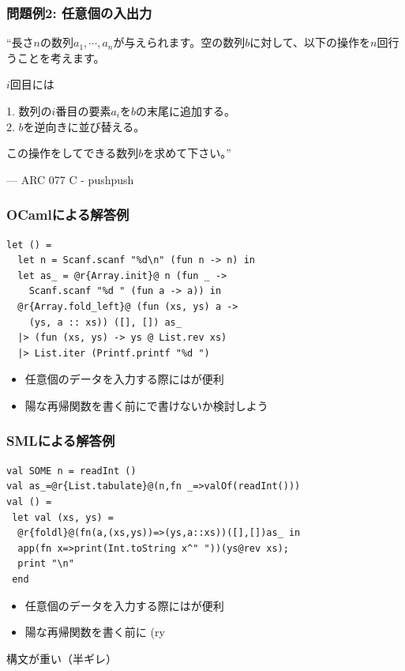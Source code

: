 \documentclass[dvipdfmx,cjk,xcolor=dvipsnames,envcountsect,notheorems,12pt]{beamer}
\theoremstyle{definition}
\begin{document}
\begin{frame}
	\frametitle{問題例2: 任意個の入出力}
	\begin{block}{}
		{\large ``長さ$n$の数列$a_1,\cdots,a_n$が与えられます。空の数列$b$に対して、以下の操作を$n$回行うことを考えます。

		\smallskip

		$i$回目には

		\smallskip

		1. 数列の$i$番目の要素$a_i$を$b$の末尾に追加する。\\
		2. $b$を逆向きに並び替える。\\

		\smallskip

		この操作をしてできる数列$b$を求めて下さい。''}
		\begin{flushright}
			--- ARC 077 C - pushpush
		\end{flushright}
	\end{block}
\end{frame}

\begin{frame}[fragile]
	\frametitle{OCamlによる解答例}
	\begin{lstlisting}
let () =
  let n = Scanf.scanf "%d\n" (fun n -> n) in
  let as_ = @r{Array.init}@ n (fun _ ->
    Scanf.scanf "%d " (fun a -> a)) in
  @r{Array.fold_left}@ (fun (xs, ys) a ->
    (ys, a :: xs)) ([], []) as_
  |> (fun (xs, ys) -> ys @ List.rev xs)
  |> List.iter (Printf.printf "%d ")
	\end{lstlisting}
	\begin{itemize}
		\item 任意個のデータを入力する際にはが便利
		\item 陽な再帰関数を書く前にで書けないか検討しよう
	\end{itemize}
\end{frame}

\begin{frame}[fragile]
	\frametitle{SMLによる解答例}
	\begin{lstlisting}
val SOME n = readInt ()
val as_=@r{List.tabulate}@(n,fn _=>valOf(readInt()))
val () =
 let val (xs, ys) =
  @r{foldl}@(fn(a,(xs,ys))=>(ys,a::xs))([],[])as_ in
  app(fn x=>print(Int.toString x^" "))(ys@rev xs);
  print "\n"
 end
	\end{lstlisting}
	\begin{itemize}
		\item 任意個のデータを入力する際にはが便利
		\item 陽な再帰関数を書く前に (ry
	\end{itemize}
	\begin{flushright}
		構文が重い（半ギレ）
	\end{flushright}
\end{frame}
\end{document}
